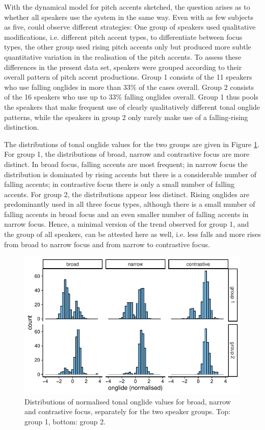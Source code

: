 With the dynamical model for pitch accents sketched, the question arises as to whether all speakers use the system in the same way. Even with as few subjects as five, \citet{Griceetal2017} could observe different strategies: One group of speakers used qualitative modifications, i.e. different pitch accent types, to differentiate between focus types, the other group used rising pitch accents only but produced more subtle quantitative variation in the realisation of the pitch accents. To assess these differences in the present data set, speakers were grouped according to their overall pattern of pitch accent productions. Group 1 consists of the 11 speakers who use falling onglides in more than 33\% of the cases overall. Group 2 consists of the 16 speakers who use up to 33\% falling onglides overall. Group 1 thus pools the speakers that make frequent use of clearly qualitatively different tonal onglide patterns, while the speakers in group 2 only rarely make use of a falling-rising distinction. 

The distributions of tonal onglide values for the two groups are given in Figure \ref{fig:onglide_distributions_groups}. For group 1, the distributions of broad, narrow and contrastive focus are more distinct. In broad focus, falling accents are most frequent; in narrow focus the distribution is dominated by rising accents but there is a considerable number of falling accents; in contrastive focus there is only a small number of falling accents. For group 2, the distributions appear less distinct. Rising onglides are predominantly used in all three focus types, although there is a small number of falling accents in broad focus and an even smaller number of falling accents in narrow focus. Hence, a minimal version of the trend observed for group 1, and the group of all speakers, can be attested here as well, i.e. less falls and more rises from broad to narrow focus and from narrow to contrastive focus.

\begin{figure}[t]
\includegraphics[width=\textwidth]{figures/ch6/onglide_norm_distribution_within_groups.pdf}
\caption[Distributions of normalised tonal onglide values for broad, narrow and contrastive focus, separately for the two speaker groups.]{Distributions of normalised tonal onglide values for broad, narrow and contrastive focus, separately for the two speaker groups. Top: group 1, bottom: group 2.}
\label{fig:onglide_distributions_groups}
\end{figure}

